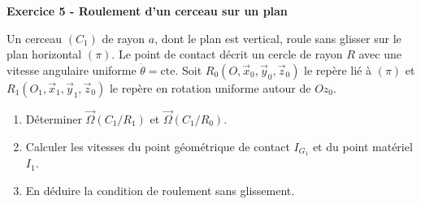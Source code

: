 \documentclass[12pt,a4paper]{article}
\begin{document}
\begin{boiteexercice}
\textbf{Exercice 5 - Roulement d'un cerceau sur un plan}\niveau{\difficile}

Un cerceau $(C_1)$ de rayon $a$, dont le plan est vertical, roule sans glisser sur le plan horizontal $(\pi)$. Le point de contact décrit un cercle de rayon $R$ avec une vitesse angulaire uniforme $\dot{\theta} = \text{cte}$. Soit $R_0(O, \vec{x}_0, \vec{y}_0, \vec{z}_0)$ le repère lié à $(\pi)$ et $R_1(O_1, \vec{x}_1, \vec{y}_1, \vec{z}_0)$ le repère en rotation uniforme autour de $Oz_0$.

\begin{enumerate}
  \item Déterminer $\vec{\Omega}(C_1/R_1)$ et $\vec{\Omega}(C_1/R_0)$.
  \item Calculer les vitesses du point géométrique de contact $I_{G_1}$ et du point matériel $I_1$.
  \item En déduire la condition de roulement sans glissement.
\end{enumerate}
\end{boiteexercice}
\end{document}
